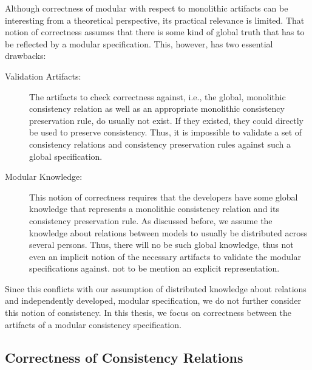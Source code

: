 Although correctness of modular with respect to monolithic artifacts can be interesting from a theoretical perspective, its practical relevance is limited.
That notion of correctness assumes that there is some kind of global truth that has to be reflected by a modular specification.
This, however, has two essential drawbacks:
\begin{description}
    \item[Validation Artifacts:] The artifacts to check correctness against, i.e., the global, monolithic \gls{consistency relation} as well as an appropriate monolithic \gls{consistency preservation rule}, do usually not exist. If they existed, they could directly be used to preserve consistency. Thus, it is impossible to validate a set of \glspl{consistency relation} and \glspl{consistency preservation rule} against such a global specification.
    \item[Modular Knowledge:] This notion of correctness requires that the developers have some global knowledge that represents a monolithic \gls{consistency relation} and its \gls{consistency preservation rule}. As discussed before, we assume  the knowledge about relations between models to usually be distributed across several persons. Thus, there will no be such global knowledge, thus not even an implicit notion of the necessary artifacts to validate the modular specifications against. not to be mention an explicit representation.
\end{description}
%
Since this conflicts with our assumption of distributed knowledge about relations and independently developed, modular specification, we do not further consider this notion of consistency.
In this thesis, we focus on correctness between the artifacts of a modular consistency specification.


\subsection{Correctness of Consistency Relations}
\label{chap:correctness:notions:relations}

